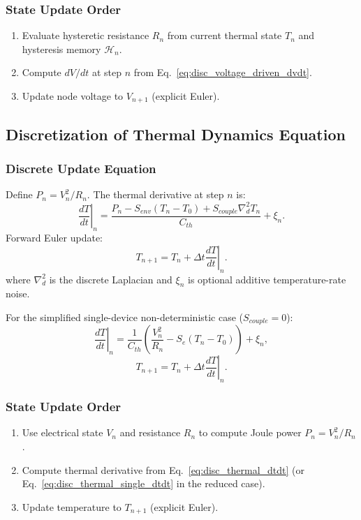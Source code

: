 \documentclass[11pt]{article}
\begin{document}
\subsubsection*{State Update Order}
\begin{enumerate}
    \item Evaluate hysteretic resistance \(R_n\) from current thermal state \(T_n\) and hysteresis memory \(\mathcal{H}_n\).
    \item Compute \(dV/dt\) at step \(n\) from Eq.~\eqref{eq:disc_voltage_driven_dvdt}.
    \item Update node voltage to \(V_{n+1}\) (explicit Euler).
\end{enumerate}

\subsection{Discretization of Thermal Dynamics Equation}
\subsubsection*{Discrete Update Equation}
Define \(P_n=V_n^2/R_n\). The thermal derivative at step \(n\) is:
\begin{equation}
\left.\frac{dT}{dt}\right|_n
=
\frac{P_n-S_{env}(T_n-T_0)+S_{couple}\nabla_d^2 T_n}{C_{th}}
+\xi_n.
\label{eq:disc_thermal_dtdt}
\end{equation}
Forward Euler update:
\begin{equation}
T_{n+1}
=
T_n
+\Delta t\left.\frac{dT}{dt}\right|_n.
\label{eq:disc_thermal_general}
\end{equation}
where \(\nabla_d^2\) is the discrete Laplacian and \(\xi_n\) is optional additive temperature-rate noise.

For the simplified single-device non-deterministic case (\(S_{couple}=0\)):
\begin{equation}
\left.\frac{dT}{dt}\right|_n
=
\frac{1}{C_{th}}
\left(
\frac{V_n^2}{R_n}
-S_e(T_n-T_0)
\right)
+\xi_n,
\label{eq:disc_thermal_single_dtdt}
\end{equation}
\begin{equation}
T_{n+1}
=
T_n
+\Delta t\left.\frac{dT}{dt}\right|_n.
\label{eq:disc_thermal_single}
\end{equation}

\subsubsection*{State Update Order}
\begin{enumerate}
    \item Use electrical state \(V_n\) and resistance \(R_n\) to compute Joule power \(P_n=V_n^2/R_n\).
    \item Compute thermal derivative from Eq.~\eqref{eq:disc_thermal_dtdt} (or Eq.~\eqref{eq:disc_thermal_single_dtdt} in the reduced case).
    \item Update temperature to \(T_{n+1}\) (explicit Euler).
\end{enumerate}
\end{document}
